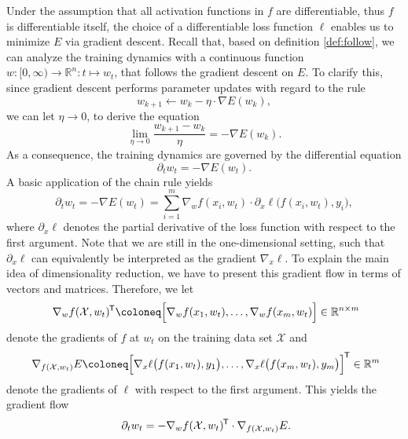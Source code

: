 \documentclass[11pt, a4paper]{article}
\newcommand{\R}{\mathbb{R}}
\newcommand{\X}{\mathcal{X}}
\newcommand*{\tr}{^{\mkern-1.5mu\mathsf{T}}}
\begin{document}
Under the assumption that all activation functions in $f$ are differentiable, thus $f$ is differentiable itself, the choice of a differentiable loss function $\ell$ enables us to minimize $E$ via gradient descent. Recall that, based on definition \ref{def:follow}, we can analyze the training dynamics with a continuous function $w : [0, \infty) \to \R^n : t \mapsto w_t$, that follows the gradient descent on $E$. To clarify this, since gradient descent performs parameter updates with regard to the rule
\[ w_{k+1} \leftarrow w_k - \eta \cdot \nabla E(w_k), \]
we can let $\eta \to 0$, to derive the equation
\[ \lim_{\eta \to 0} \frac{w_{k+1} - w_k}{\eta} = - \nabla E(w_k). \]
As a consequence, the training dynamics are governed by the differential equation
\[ \partial_tw_t = -\nabla E (w_t ). \]
A basic application of the chain rule yields
\[ \partial_t w_t = -\nabla E (w_t ) = \sum_{i=1}^{m} \nabla_w f(x_i,w_t) \cdot \partial_x \ell \big ( f(x_i,w_t), y_i \big ), \]
where $\partial_x \ell$ denotes the partial derivative of the loss function with respect to the first argument. Note that we are still in the one-dimensional setting, such that $\partial_x \ell$ can equivalently be interpreted as the gradient $\nabla_x \ell$. To explain the main idea of dimensionality reduction, we have to present this gradient flow in terms of vectors and matrices. Therefore, we let
\[ \nabla_w f(\X, w_t)\tr \coloneq \Big [ \nabla_wf(x_1,w_t), \dots, \nabla_wf(x_m, w_t) \Big ] \in \R^{n \times m} \]
denote the gradients of $f$ at $w_t$ on the training data set $\X$ and
\[ \nabla_{f(\X,w_t)} E \coloneq \Big [ \nabla_x \ell \big ( f(x_1,w_t), y_1 \big ), \dots, \nabla_x \ell \big ( f(x_m,w_t), y_m \big ) \Big ]\tr \in \R^m \]
denote the gradients of $\ell$ with respect to the first argument. This yields the gradient flow
\[ \partial_tw_t = - \nabla_w f(\X, w_t)\tr \cdot \nabla_{f(\X,w_t)} E. \]
\end{document}
